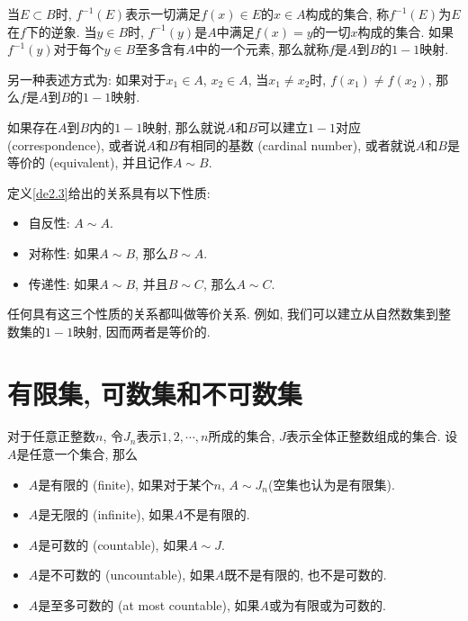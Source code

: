 \documentclass[cn,12pt,math=mtpro2,citestyle=gb7714-2015,bibstyle=gb7714-2015,twocol]{elegantbook}
\begin{document}
\begin{definition}

当$E\subset B$时, $f^{-1}(E)$表示一切满足$f(x)\in E$的$x\in A$构成的集合, 称$f^{-1}(E)$为$E$在$f$下的逆象. 当$y\in B$时, $f^{-1}(y)$是$A$中满足$f(x)=y$的一切$x$构成的集合. 如果$f^{-1}(y)$对于每个$y\in B$至多含有$A$中的一个元素, 那么就称$f$是$A$到$B$的$1-1$映射.
\end{definition}
\begin{remark}
 另一种表述方式为: 如果对于$x_1\in A$, $x_2\in A$, 当$x_1\neq x_2$时, $f(x_1)\neq f(x_2)$, 那么$f$是$A$到$B$的$1-1$映射.
\end{remark}

\begin{definition}\label{de2.3}
如果存在$A$到$B$内的$1-1$映射, 那么就说$A$和$B$可以建立$1-1$对应 (correspondence), 或者说$A$和$B$有相同的基数 (cardinal number), 或者就说$A$和$B$是等价的 (equivalent), 并且记作$A\sim B$.
\end{definition}

定义\ref{de2.3}给出的关系具有以下性质:
\begin{itemize}
\item 自反性: $A\sim A$.

\item 对称性: 如果$A\sim B$, 那么$B\sim A$.

\item 传递性: 如果$A\sim B$, 并且$B\sim C$, 那么$A \sim C$.
\end{itemize}
任何具有这三个性质的关系都叫做等价关系. 例如, 我们可以建立从自然数集到整数集的$1-1$映射, 因而两者是等价的.

\section{有限集, 可数集和不可数集}
\begin{definition}\label{de2.4}
对于任意正整数$n$, 令$J_n$表示$1, 2, \cdots, n$所成的集合, $J$表示全体正整数组成的集合. 设$A$是任意一个集合, 那么
\begin{itemize}
\item $A$是有限的 (finite), 如果对于某个$n$, $A\sim J_n$(空集也认为是有限集).

\item $A$是无限的 (infinite), 如果$A$不是有限的.

\item $A$是可数的 (countable), 如果$A\sim J$.

\item $A$是不可数的 (uncountable), 如果$A$既不是有限的, 也不是可数的.

\item $A$是至多可数的 (at most countable), 如果$A$或为有限或为可数的.
\end{itemize}
\end{definition}
\end{document}
